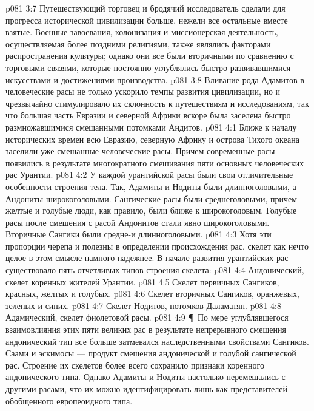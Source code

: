 \vs p081 3:7 Путешествующий торговец и бродячий исследователь сделали для прогресса исторической цивилизации больше, нежели все остальные вместе взятые. Военные завоевания, колонизация и миссионерская деятельность, осуществляемая более поздними религиями, также являлись факторами распространения культуры; однако они все были вторичными по сравнению с торговыми связями, которые постоянно углублялись быстро развивавшимися искусствами и достижениями производства.
\vs p081 3:8 Вливание рода Адамитов в человеческие расы не только ускорило темпы развития цивилизации, но и чрезвычайно стимулировало их склонность к путешествиям и исследованиям, так что большая часть Евразии и северной Африки вскоре была заселена быстро размножавшимися смешанными потомками Андитов.
\vs p081 4:1 Ближе к началу исторических времен всю Евразию, северную Африку и острова Тихого океана заселили уже смешанные человеческие расы. Причем современные расы появились в результате многократного смешивания пяти основных человеческих рас Урантии.
\vs p081 4:2 У каждой урантийской расы были свои отличительные особенности строения тела. Так, Адамиты и Нодиты были длинноголовыми, а Андониты широкоголовыми. Сангические расы были среднеголовыми, причем желтые и голубые люди, как правило, были ближе к широкоголовым. Голубые расы после смешения с расой Андонитов стали явно широкоголовыми. Вторичные Сангики были средне\hyp{}и длинноголовыми.
\vs p081 4:3 Хотя эти пропорции черепа и полезны в определении происхождения рас, скелет как нечто целое в этом смысле намного надежнее. В начале развития урантийских рас существовало пять отчетливых типов строения скелета:
\vs p081 4:4 \bibnobreakspace Андонический, скелет коренных жителей Урантии.
\vs p081 4:5 \bibnobreakspace Скелет первичных Сангиков, красных, желтых и голубых.
\vs p081 4:6 \bibnobreakspace Скелет вторичных Сангиков, оранжевых, зеленых и синих.
\vs p081 4:7 \bibnobreakspace Скелет Нодитов, потомков Даламатян.
\vs p081 4:8 \bibnobreakspace Адамический, скелет фиолетовой расы.
\vs p081 4:9 \P\ По мере углублявшегося взаимовлияния этих пяти великих рас в результате непрерывного смешения андонический тип все больше затмевался наследственными свойствами Сангиков. Саами и эскимосы --- продукт смешения андонической и голубой сангической рас. Строение их скелетов более всего сохранило признаки коренного андонического типа. Однако Адамиты и Нодиты настолько перемешались с другими расами, что их можно идентифицировать лишь как представителей обобщенного европеоидного типа.
